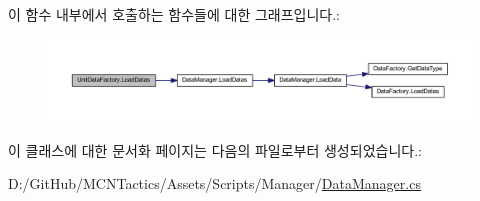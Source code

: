 이 함수 내부에서 호출하는 함수들에 대한 그래프입니다.\+:\nopagebreak
\begin{figure}[H]
\begin{center}
\leavevmode
\includegraphics[width=350pt]{class_unit_data_factory_a048e5ca3d28d88eddf55537a4930f1df_cgraph}
\end{center}
\end{figure}




이 클래스에 대한 문서화 페이지는 다음의 파일로부터 생성되었습니다.\+:\begin{DoxyCompactItemize}
\item 
D\+:/\+Git\+Hub/\+M\+C\+N\+Tactics/\+Assets/\+Scripts/\+Manager/\hyperlink{_data_manager_8cs}{Data\+Manager.\+cs}\end{DoxyCompactItemize}
